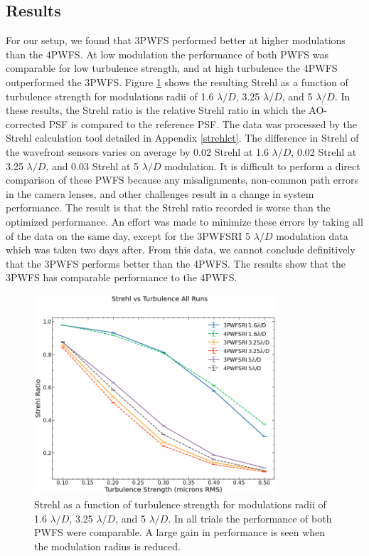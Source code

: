 \documentclass[12pt]{spieman}  %
\begin{document}
\begin{spacing}{2}
\section{Results}
For our setup, we found that 3PWFS performed better at higher modulations than the 4PWFS. At low modulation the performance of both PWFS was comparable for low turbulence strength, and at high turbulence the 4PWFS outperformed the 3PWFS. Figure \ref{fig:results} shows the resulting Strehl as a function of turbulence strength for modulations radii of 1.6 $\lambda/D$, 3.25 $\lambda/D$, and 5 $\lambda/D$. In these results, the Strehl ratio is the relative Strehl ratio in which the AO-corrected PSF is compared to the reference PSF. The data was processed by the Strehl calculation tool detailed in Appendix \ref{strehlct}. The difference in Strehl of the wavefront sensors varies on average by 0.02 Strehl at 1.6 $\lambda/D$, 0.02 Strehl at 3.25 $\lambda/D$, and 0.03 Strehl at 5 $\lambda/D$ modulation. It is difficult to perform a direct comparison of these PWFS because any misalignments, non-common path errors in the camera lenses, and other challenges result in a change in system performance. The result is that the Strehl ratio recorded is worse than the optimized performance. An effort was made to minimize these errors by taking all of the data on the same day, except for the 3PWFSRI 5 $\lambda/D$ modulation data which was taken two days after. From this data, we cannot conclude definitively that the 3PWFS performs better than the 4PWFS. The results show that the 3PWFS has comparable performance to the 4PWFS. 


\begin{figure}
    \centering
    \includegraphics[width=0.8\textwidth]{StrehlvsTurbRI4vs3.png}
    \caption{ Strehl as a function of turbulence strength for modulations radii of 1.6 $\lambda/D$, 3.25 $\lambda/D$, and 5 $\lambda/D$. In all trials the performance of both PWFS were comparable. A large gain in performance is seen when the modulation radius is reduced.}
    \label{fig:results}
\end{figure}


\end{spacing}
\end{document}
